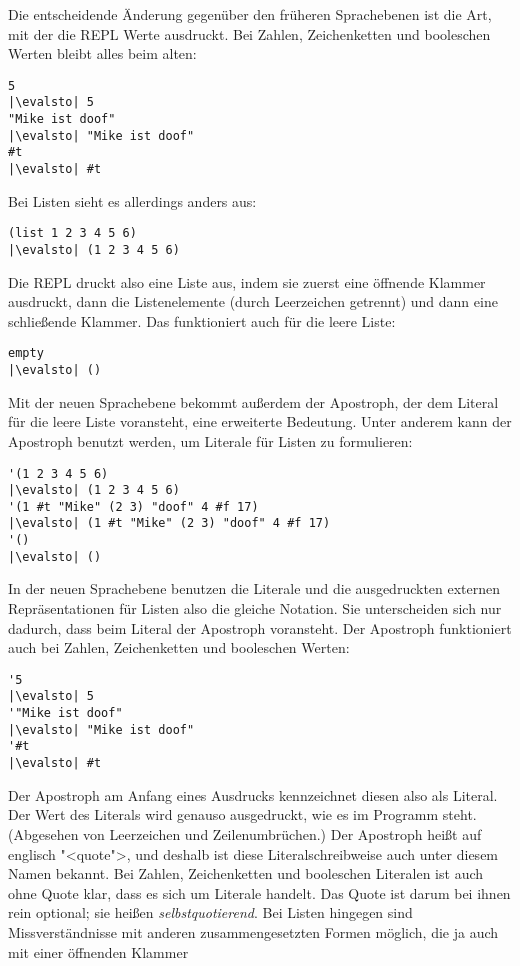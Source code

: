 Die entscheidende Änderung gegenüber den früheren Sprachebenen ist
die Art, mit der die REPL Werte ausdruckt.  Bei Zahlen, Zeichenketten
und booleschen Werten bleibt alles beim alten:
%
\begin{lstlisting}
5
|\evalsto| 5
"Mike ist doof"
|\evalsto| "Mike ist doof"
#t
|\evalsto| #t
\end{lstlisting}
%
Bei Listen sieht es allerdings anders aus:
%
\begin{lstlisting}
(list 1 2 3 4 5 6)
|\evalsto| (1 2 3 4 5 6)
\end{lstlisting}
%
Die REPL druckt also eine Liste aus, indem sie zuerst eine öffnende
Klammer ausdruckt, dann die Listenelemente (durch Leerzeichen
getrennt) und dann eine schließende Klammer.
Das funktioniert auch für die leere Liste:
%
\begin{lstlisting}
empty
|\evalsto| ()
\end{lstlisting}
%
Mit der neuen Sprachebene bekommt außerdem der Apostroph, der dem
Literal für die leere Liste voransteht, eine erweiterte Bedeutung.
Unter anderem kann der Apostroph benutzt werden, um Literale für
Listen zu formulieren:
%
\begin{lstlisting}
'(1 2 3 4 5 6)
|\evalsto| (1 2 3 4 5 6)
'(1 #t "Mike" (2 3) "doof" 4 #f 17)
|\evalsto| (1 #t "Mike" (2 3) "doof" 4 #f 17)
'()
|\evalsto| ()
\end{lstlisting}
%
In der neuen Sprachebene benutzen die Literale und die ausgedruckten
externen Repräsentationen für Listen also die gleiche
Notation.  Sie unterscheiden sich nur dadurch,
dass beim Literal der Apostroph voransteht.  Der Apostroph funktioniert
auch bei Zahlen, Zeichenketten und booleschen Werten:
%
\begin{lstlisting}
'5
|\evalsto| 5
'"Mike ist doof"
|\evalsto| "Mike ist doof"
'#t
|\evalsto| #t
\end{lstlisting}
%
Der Apostroph am Anfang eines Ausdrucks
kennzeichnet diesen also als Literal.  Der Wert des Literals wird 
genauso ausgedruckt, wie es im Programm steht.  (Abgesehen von
Leerzeichen und Zeilenumbrüchen.)  Der Apostroph heißt auf englisch
"<quote">, und deshalb ist diese
Literalschreibweise auch unter diesem Namen bekannt.  Bei Zahlen,
Zeichenketten und booleschen Literalen ist auch ohne Quote klar, dass
es sich um Literale handelt.  Das Quote ist darum bei ihnen rein
optional; sie heißen 
\textit{selbstquotierend}.
Bei Listen hingegen sind Missverständnisse mit anderen
zusammengesetzten Formen möglich, die ja auch mit einer öffnenden Klammer
